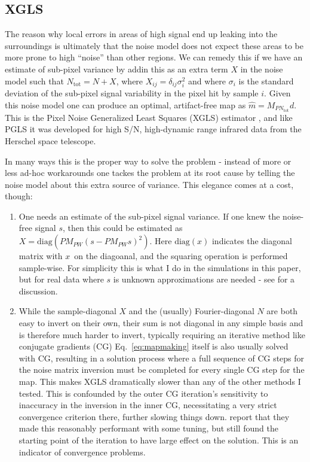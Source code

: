 \documentclass{article}
\begin{document}
\subsection{XGLS}
The reason why local errors in areas of high signal end up leaking into the surroundings
is ultimately that the noise model does not expect these areas to be more prone to high
``noise'' than other regions. We can remedy this if we have an estimate of sub-pixel variance
by addin this as an extra term $X$ in the noise model such that $N_\textrm{tot} = 
N + X$, where $X_{ij} = \delta_{ij} \sigma_i^2$ and where $\sigma_i$ is the standard deviation
of the sub-pixel signal variability in the pixel hit by sample $i$. Given this noise model one can
produce an optimal, artifact-free map as $\hat m = M_{PN_\textrm{tot}} d$. This is the
Pixel Noise Generalized Least Squares (XGLS) estimator \citep{xgls-2017}, and like PGLS it
was developed for high S/N, high-dynamic range infrared data from the Herschel space telescope.

In many ways this is the proper way to solve the problem - instead of more or
less ad-hoc workarounds one tackes the problem at its root cause by telling the
noise model about this extra source of variance. This elegance comes at a cost, though:
\begin{enumerate}
	\item One needs an estimate of the sub-pixel signal variance. If one knew the noise-free
		signal $s$, then this could be estimated as $X = \textrm{diag}(PM_{PW}(s-PM_{PW}s)^2)$.
		Here $\textrm{diag}(x)$ indicates the diagonal matrix with $x$ on the diagoanal, and
		the squaring operation is performed sample-wise.
		For simplicity this is what I do in the simulations in this paper, but for real data
		where $s$ is unknown approximations are needed - see \citet{xgls-2017} for a discussion.
	\item While the sample-diagonal $X$ and the (usually) Fourier-diagonal $N$ are both easy
		to invert on their own, their sum is not diagonal in any simple basis and is therefore
		much harder to invert, typically requiring an iterative method like conjugate gradients (CG)
		Eq.~\ref{eq:mapmaking} itself is also usually solved with CG, resulting
		in a solution process where a full sequence of CG steps for the noise matrix inversion
		must be completed for every single CG step for the map. This makes XGLS dramatically
		slower than any of the other methods I tested. This is confounded by the outer CG iteration's
		sensitivity to inaccuracy in the inversion in the inner CG, necessitating a very strict
		convergence criterion there, further slowing things down. \citet{xgls-2017} report that
		they made this reasonably performant with some tuning, but still found the starting point
		of the iteration to have large effect on the solution. This is an indicator of convergence
		problems.
\end{enumerate}
\end{document}
